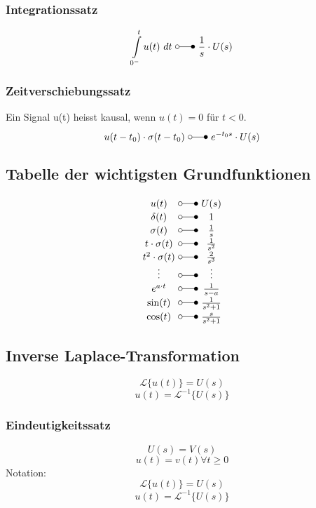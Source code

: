 \subsubsection{Integrationssatz}
\[ 
    \int\limits_{0^-}^{t} u(t) ~ dt ~ \laplace ~ \frac{1}{s} \cdot U(s) 
\]

\subsubsection{Zeitverschiebungssatz}
Ein Signal u(t) heisst kausal, wenn $u(t) = 0$ für $t < 0$.
\[ 
    u(t - t_0) \cdot \sigma(t - t_0) ~ \laplace ~ e^{-t_0s} \cdot U(s) 
\]

\subsection{Tabelle der wichtigsten Grundfunktionen}
\[ 
    \begin{array}{c@{ ~ \laplace ~ }c}
        u(t) 
            & U(s) \\
        \delta(t) 
            & 1 \\
        \sigma(t) 
            & \frac{1}{s} \\
        t \cdot \sigma(t) 
            & \frac{1}{s^2} \\
        t^2 \cdot \sigma(t) 
            & \frac{2}{s^3} \\
        \vdots 
            & \vdots \\
        e^{a \cdot t} 
            & \frac{1}{s - a} \\
        \sin(t) 
            & \frac{1}{s^2 + 1} \\
        \cos(t) 
            & \frac{s}{s^2 + 1} \\
    \end{array} 
\]

\subsection{Inverse Laplace-Transformation}
\[ 
    \mathcal{L} \lbrace u(t) \rbrace = U(s)
\]
\[ 
    u(t) = \mathcal{L}^{-1} \lbrace U(s) \rbrace
\]

\subsubsection{Eindeutigkeitssatz}
\[ 
    U(s) = V(s) 
\]
\[ 
    u(t) = v(t) \forall t \geq 0 
\]
Notation:
\[ 
    \mathcal{L} \{ u(t) \} = U(s) 
\]
\[ 
    u(t) = \mathcal{L}^{-1} \{ U(s) \} 
\]

